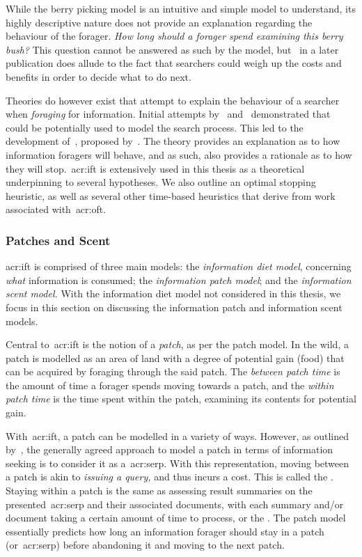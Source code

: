 While the berry picking model is an intuitive and simple model to understand, its highly descriptive nature does not provide an explanation regarding the behaviour of the forager. \emph{How long should a forager spend examining this berry bush?} This question cannot be answered as such by the model, but~\cite{bates1989alluding} in a later publication does allude to the fact that searchers could weigh up the costs and benefits in order to decide what to do next.

Theories do however exist that attempt to explain the behaviour of a searcher when \emph{foraging} for information. Initial attempts by~\cite{russell1993sense_making} and~\cite{sandstrom1994optimal_foraging} demonstrated that~~\citep{stephens1986foraging_theory} could be potentially used to model the search process. This led to the development of~, proposed by~\cite{pirolli1999ift}. The theory provides an explanation as to how information foragers will behave, and as such, also provides a rationale as to how they will stop.~\gls{acr:ift} is extensively used in this thesis as a theoretical underpinning to several hypotheses. We also outline an optimal stopping heuristic, as well as several other time-based heuristics that derive from work associated with~\gls{acr:oft}.

\subsubsection{Patches and Scent}\label{sec:stopping_background:theoretical:ift:patch}
\gls{acr:ift} is comprised of three main models: the \emph{information diet model}, concerning \emph{what} information is consumed; the \emph{information patch model}; and the \emph{information scent model.} With the information diet model not considered in this thesis, we focus in this section on discussing the information patch and information scent models.

Central to~\gls{acr:ift} is the notion of a \emph{patch}, as per the patch model. In the wild, a patch is modelled as an area of land with a degree of potential gain (food) that can be acquired by foraging through the said patch. The \emph{between patch time} is the amount of time a forager spends moving towards a patch, and the \emph{within patch time} is the time spent within the patch, examining its contents for potential gain.

With~\gls{acr:ift}, a patch can be modelled in a variety of ways. However, as outlined by~\cite{azzopardi2015theories}, the generally agreed approach to model a patch in terms of information seeking is to consider it as a~\gls{acr:serp}. With this representation, moving between a patch is akin to \emph{issuing a query,} and thus incurs a cost. This is called the . Staying within a patch is the same as assessing result summaries on the presented~\gls{acr:serp} and their associated documents, with each summary and/or document taking a certain amount of time to process, or the . The patch model essentially predicts how long an information forager should stay in a patch (or~\gls{acr:serp}) before abandoning it and moving to the next patch.

